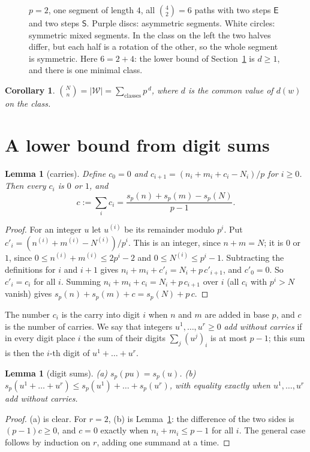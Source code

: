 \documentclass[11pt]{article}
\newtheorem{lemma}[theorem]{Lemma}
\newtheorem{corollary}[theorem]{Corollary}
\theoremstyle{definition}
\theoremstyle{remark}
\newcommand{\E}{\textsf{E}}
\newcommand{\Ss}{\textsf{S}}
\newcommand{\W}{\mathcal{W}}
\begin{document}
\begin{figure}[ht]
\centering
\begin{tikzpicture}

\end{tikzpicture}
\caption{$p=2$, one segment of length $4$, all $\binom42=6$ paths with two steps $\E$ and two steps $\Ss$.
Purple discs: asymmetric segments. White circles: symmetric mixed segments. In the class on the left the two halves
differ, but each half is a rotation of the other, so the whole segment is symmetric.
Here $6=2+4$: the lower bound of Section~\ref{sec:bound} is $d\ge1$, and there is one minimal class.}
\label{fig:classes}
\end{figure}

\begin{corollary}\label{cor:sum}
$\displaystyle\binom Nn=|\W|=\sum_{\text{classes}}p^{\,d}$, where $d$ is the common value of $d(w)$ on the class.
\end{corollary}

\section{A lower bound from digit sums}\label{sec:bound}

\begin{lemma}[carries]\label{lem:carries}
Define $c_0=0$ and $c_{i+1}=(n_i+m_i+c_i-N_i)/p$ for $i\ge 0$. Then every $c_i$ is $0$ or $1$, and
\[
c:=\sum_i c_i=\frac{s_p(n)+s_p(m)-s_p(N)}{p-1}.
\]
\end{lemma}
\begin{proof}
For an integer $u$ let $u^{(i)}$ be its remainder modulo $p^i$. Put $c'_i=(n^{(i)}+m^{(i)}-N^{(i)})/p^i$. This is an
integer, since $n+m=N$; it is $0$ or $1$, since $0\le n^{(i)}+m^{(i)}\le 2p^i-2$ and $0\le N^{(i)}\le p^i-1$.
Subtracting the definitions for $i$ and $i+1$ gives $n_i+m_i+c'_i=N_i+p\,c'_{i+1}$, and $c'_0=0$. So $c'_i=c_i$ for
all $i$. Summing $n_i+m_i+c_i=N_i+p\,c_{i+1}$ over $i$
(all $c_i$ with $p^i>N$ vanish) gives $s_p(n)+s_p(m)+c=s_p(N)+p\,c$.
\end{proof}

The number $c_i$ is the carry into digit $i$ when $n$ and $m$ are added in base $p$, and $c$ is the number of
carries. We say that integers $u^1,\dots,u^r\ge0$ \emph{add without carries} if in every digit place $i$ the sum of
their digits $\sum_j (u^j)_i$ is at most $p-1$; this sum is then the $i$-th digit of $u^1+\dots+u^r$.

\begin{lemma}[digit sums]\label{lem:digits}
\textup{(a)} $s_p(pu)=s_p(u)$. \textup{(b)} $s_p(u^1+\dots+u^r)\le s_p(u^1)+\dots+s_p(u^r)$, with equality
exactly when $u^1,\dots,u^r$ add without carries.
\end{lemma}
\begin{proof}
(a) is clear. For $r=2$, (b) is Lemma~\ref{lem:carries}: the difference of the two sides is $(p-1)c\ge0$, and $c=0$
exactly when $n_i+m_i\le p-1$ for all $i$. The general case follows by induction on $r$, adding one summand at a time.
\end{proof}
\end{document}

